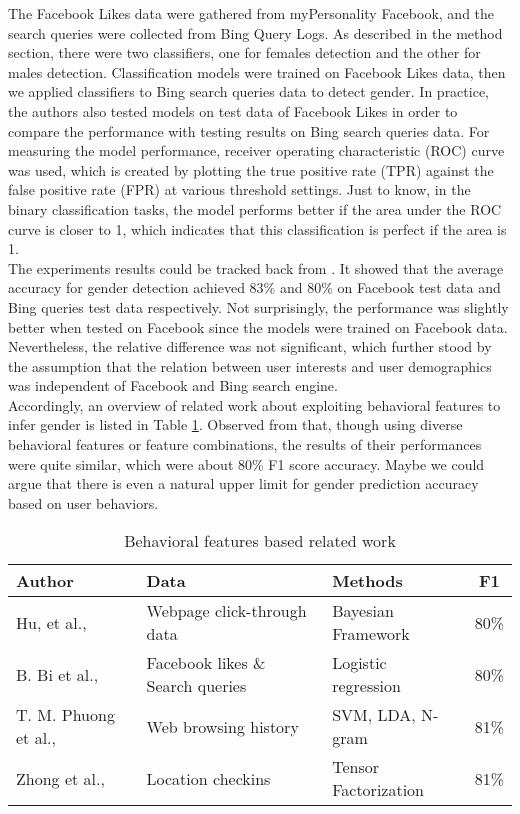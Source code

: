 \documentclass[runningheads]{llncs}
\begin{document}
    The Facebook Likes data were gathered from myPersonality Facebook, and the search queries were collected from Bing Query Logs. As described in the method section, there were two classifiers, one for females detection and the other for males detection. Classification models were trained on Facebook Likes data, then we applied classifiers to Bing search queries data to detect gender. In practice, the authors also tested models on test data of Facebook Likes in order to compare the performance with testing results on Bing search queries data. For measuring the model performance, receiver operating characteristic (ROC) curve was used, which is created by plotting the true positive rate (TPR) against the false positive rate (FPR) at various threshold settings. Just to know, in the binary classification tasks, the model performs better if the area under the ROC curve is closer to 1, which indicates that this classification is perfect if the area is 1. \\
	
	The experiments results could be tracked back from \cite{bi2013inferring}. It showed that the average accuracy for gender detection achieved 83\% and 80\% on Facebook test data and Bing queries test data respectively. Not surprisingly, the performance was slightly better when tested on Facebook since the models were trained on Facebook data. Nevertheless, the relative difference was not significant, which further stood by the assumption that the relation between user interests and user demographics was independent of Facebook and Bing search engine. \\
	
	Accordingly, an overview of related work about exploiting behavioral features to infer gender is listed in Table \ref{table:behavioral_work}. Observed from that, though using diverse behavioral features or feature combinations, the results of their performances were quite similar, which were about 80\% F1 score accuracy. Maybe we could argue that there is even a natural upper limit for gender prediction accuracy based on user behaviors. 
	
	\begin{table}
		\caption{Behavioral features based related work }
		\centering
		\begin{tabular}{| l | l | l | c | }
			\hline
			Author  &  Data  & Methods & F1\\
			\hline
			Hu, et al.,  \cite{hu2007demographic} & Webpage click-through data
			& Bayesian Framework
			& 80\% \\
			B. Bi et al., \cite{bi2013inferring} & Facebook likes \& Search queries & Logistic regression & 80\% \\
			T. M. Phuong et al., \cite{phuong2014gender} & Web browsing history & SVM, LDA, N-gram
			& 81\% \\
			Zhong et al., \cite{zhong2015you} & Location checkins & Tensor Factorization & 81\% \\
			\hline
		\end{tabular}
		\label{table:behavioral_work}
	\end{table}
	\newpage
\end{document}
